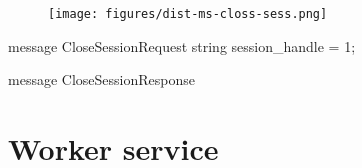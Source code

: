 \begin{content}
\begin{figure}[H]
  \centering
  \texttt{[image: figures/dist-ms-closs-sess.png]}
  \caption{}
  \label{fig:dist-ms-closs-sess}
\end{figure}

\begin{leftbar}
\begin{c++}
message CloseSessionRequest {
  string session_handle = 1;
}

message CloseSessionResponse {
}
\end{c++}
\end{leftbar}

\end{content}


\section{Worker service}
